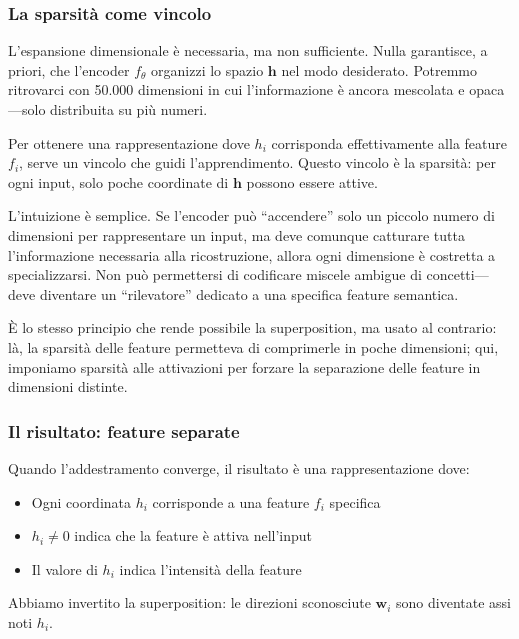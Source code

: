 \subsubsection{La sparsità come vincolo}

L'espansione dimensionale è necessaria, ma non sufficiente. Nulla garantisce, a priori, che l'encoder $f_\theta$ organizzi lo spazio $\mathbf{h}$ nel modo desiderato. Potremmo ritrovarci con 50.000 dimensioni in cui l'informazione è ancora mescolata e opaca—solo distribuita su più numeri.

Per ottenere una rappresentazione dove $h_i$ corrisponda effettivamente alla feature $f_i$, serve un vincolo che guidi l'apprendimento. Questo vincolo è la sparsità: per ogni input, solo poche coordinate di $\mathbf{h}$ possono essere attive.

L'intuizione è semplice. Se l'encoder può ``accendere'' solo un piccolo numero di dimensioni per rappresentare un input, ma deve comunque catturare tutta l'informazione necessaria alla ricostruzione, allora ogni dimensione è costretta a specializzarsi. Non può permettersi di codificare miscele ambigue di concetti—deve diventare un ``rilevatore'' dedicato a una specifica feature semantica.

È lo stesso principio che rende possibile la superposition, ma usato al contrario: là, la sparsità delle feature permetteva di comprimerle in poche dimensioni; qui, imponiamo sparsità alle attivazioni per forzare la separazione delle feature in dimensioni distinte.

\subsubsection{Il risultato: feature separate}

Quando l'addestramento converge, il risultato è una rappresentazione dove:
\begin{itemize}
    \item Ogni coordinata $h_i$ corrisponde a una feature $f_i$ specifica
    \item $h_i \neq 0$ indica che la feature è attiva nell'input
    \item Il valore di $h_i$ indica l'intensità della feature
\end{itemize}

Abbiamo invertito la superposition: le direzioni sconosciute $\mathbf{w}_i$ sono diventate assi noti $h_i$.

